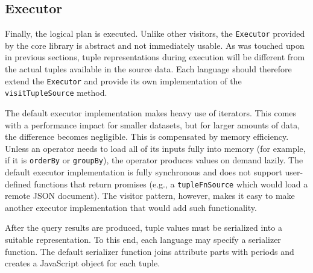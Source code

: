 \subsection{Executor}

Finally, the logical plan is executed. Unlike other visitors, the \texttt{Executor} provided by the core library is abstract and not immediately usable. As was touched upon in previous sections, tuple representations during execution will be different from the actual tuples available in the source data. Each language should therefore extend the \texttt{Executor} and provide its own implementation of the \texttt{visitTupleSource} method.

The default executor implementation makes heavy use of iterators. This comes with a performance impact for smaller datasets, but for larger amounts of data, the difference becomes negligible. This is compensated by memory efficiency. Unless an operator needs to load all of its inputs fully into memory (for example, if it is \texttt{orderBy} or \texttt{groupBy}), the operator produces values on demand lazily. The default executor implementation is fully synchronous and does not support user-defined functions that return promises (e.g., a \texttt{tupleFnSource} which would load a remote JSON document). The visitor pattern, however, makes it easy to make another executor implementation that would add such functionality.

After the query results are produced, tuple values must be serialized into a suitable representation. To this end, each language may specify a serializer function. The default serializer function joins attribute parts with periods and creates a JavaScript object for each tuple.